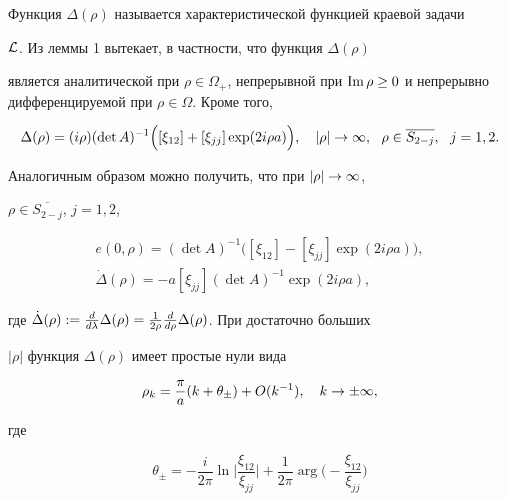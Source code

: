 Функция $\Delta(\rho)$ называется характеристической функцией краевой задачи


${\cal L}$. Из леммы 1 вытекает, в частности, что функция $\Delta(\rho)$


является аналитической при $\rho\in\Omega_{+}$, непрерывной при $\im


\rho\ge 0$ и непрерывно дифференцируемой при $\rho\in\Omega$. Кроме того,


\begin{equation}


\Delta(\rho)=(i\rho)(\det A)^{-1}\Big([\xi_{12}]+


[\xi_{jj}]\exp(2i\rho a)\Big), \quad


|\rho|\to\iy,\ \ \rho\in\overline{S_{2-j}},\ \ j=1,2.


\end{equation}


Аналогичным образом можно получить, что при $|\rho|\to\infty$,


$\rho\in\overline{S_{2-j}}$, $j=1,2$,


\begin{gather}


e(0,\rho)=(\det A)^{-1}


\big([\xi_{12}]-[\xi_{jj}]\exp(2i\rho a)\big), \\


%


\Dot\Delta(\rho)=-a[\xi_{jj}](\det A)^{-1}\exp(2i\rho a),


\end{gather}


где $\Dot\Delta(\rho):=\frac{d}{d\la}\Delta(\rho)=


\frac{1}{2\rho}\frac{d}{d\rho}\Delta(\rho)$. При достаточно больших


$|\rho|$ функция $\Delta(\rho)$ имеет простые нули вида


\begin{equation}


\rho_k=\frac{\pi}{a}(k+\theta_{\pm})+O(k^{-1}),\quad k\to\pm\iy,


\end{equation}


где


\begin{equation}


\theta_{\pm}=-\frac{i}{2\pi}\ln\bigg|\frac{\xi_{12}}{\xi_{jj}}\bigg|


+\frac{1}{2\pi}\arg\bigg(-\frac{\xi_{12}}{\xi_{jj}}\bigg)


\end{equation}


